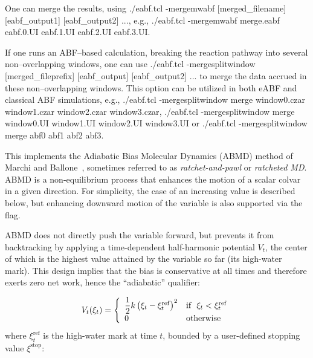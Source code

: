 {One can merge the results, using
{\ttfamily ./eabf.tcl -mergemwabf [merged\_filename] [eabf\_output1] [eabf\_output2] ...},
e.g.,
{\ttfamily ./eabf.tcl -mergemwabf merge.eabf eabf.0.UI eabf.1.UI eabf.2.UI eabf.3.UI}.

If one runs an ABF--based calculation, breaking the reaction pathway
into several non--overlapping windows, one can use
{\ttfamily ./eabf.tcl -mergesplitwindow [merged\_fileprefix] [eabf\_output] [eabf\_output2] ...}
to merge the data accrued in these non--overlapping windows.
This option can be utilized in both eABF and classical ABF simulations, e.g.,
{\ttfamily ./eabf.tcl -mergesplitwindow merge window0.czar window1.czar window2.czar window3.czar},
{\ttfamily ./eabf.tcl -mergesplitwindow merge window0.UI window1.UI window2.UI window3.UI} or
{\ttfamily ./eabf.tcl -mergesplitwindow merge abf0 abf1 abf2 abf3}.
}




This implements the Adiabatic Bias Molecular Dynamics (ABMD) method of Marchi and Ballone\ \cite{Marchi1999}, sometimes referred to as \emph{ratchet-and-pawl} or \emph{ratcheted MD}.
ABMD is a non-equilibrium process that enhances the motion of a scalar colvar in a given direction.
For simplicity, the case of an increasing value is described below, but enhancing downward motion of the variable is also supported via the  flag.

ABMD does not directly push the variable forward, but prevents it from backtracking by applying a time-dependent half-harmonic potential $V_t$, the center of which is the highest value attained by the variable so far (its high-water mark).
This design implies that the bias is conservative at all times and therefore exerts zero net work, hence the ``adiabatic'' qualifier:

\begin{equation}
  \label{eq:colvarbias_abmd}
  V_t(\xi_t) = \left\{
    \begin{array}{l l}
      \dfrac{1}{2} k \left(\xi_t - \xi^{\mathrm{ref}}_t\right)^2 & \text{if }\ \xi_t < \xi^{\mathrm{ref}}_t \\
      0 & \text{otherwise}
    \end{array}
  \right.
\end{equation}
\noindent{}where $\xi^{\mathrm{ref}}_t$ is the high-water mark at time $t$, bounded by a user-defined stopping value $\xi^{\mathrm{stop}}$:

